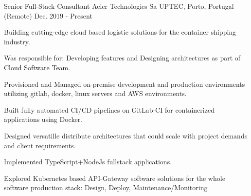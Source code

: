 

\begin{cventries}

  \cventry
    {Senior Full-Stack Consultant} %
    {Aeler Technologies Sa} %
		{UPTEC, Porto, Portugal (Remote)} %
    {Dec. 2019 - Present} %
    {
      \begin{cvitems} %
        \item {Building cutting-edge cloud based logistic solutions for the container shipping industry.}
        \item {Was responsible for: Developing features and Designing architectures as part of Cloud Software Team.}
	\item {Provisioned and Managed on-premise development and production environments utilizing gitlab, docker, linux servers and AWS environments.}
        \item {Built fully automated CI/CD pipelines on GitLab-CI for containerized applications using Docker.}
				\item {Designed versatille distribute architectures that could scale with project demands and client requirements.}
        \item {Implemented TypeScript+NodeJs fullstack applications.}
        \item {Explored Kubernetes based API-Gateway software solutions for the whole software production stack: Design, Deploy, Maintenance/Monitoring}
      \end{cvitems}
    }


\end{cventries}
